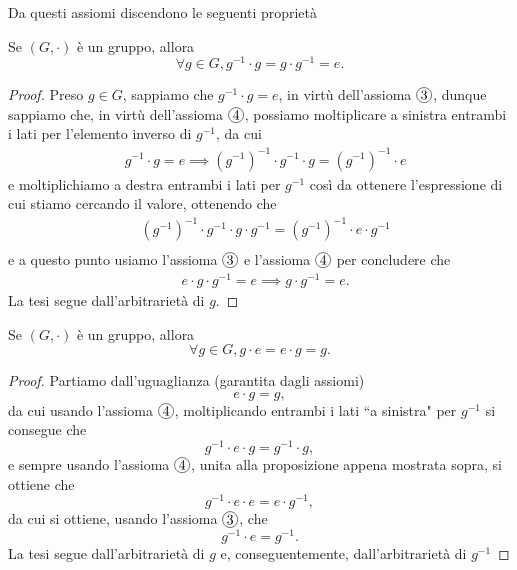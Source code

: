 Da questi assiomi discendono le seguenti proprietà
\begin{prop}
	Se $(G, \cdot)$ è un gruppo, allora
	\begin{equation}
	\forall g \in G, g^{-1} \cdot g = g \cdot g^{-1} = e. 
	\end{equation}
\end{prop}
\begin{proof}
	Preso $g \in G$, sappiamo che $g^{-1} \cdot g = e$, in virtù dell'assioma $\circled{3}$, dunque sappiamo che, in virtù dell'assioma $\circled{4}$, possiamo moltiplicare a sinistra entrambi i lati per
	l'elemento inverso di $g^{-1}$, da cui 
	\begin{align}
	&g^{-1} \cdot g = e \implies (g^{-1})^{-1} \cdot g^{-1} \cdot g = (g^{-1})^{-1} \cdot e
	\end{align}
	e moltiplichiamo a destra entrambi i lati per $g^{-1}$ così da ottenere l'espressione di cui stiamo cercando il valore, ottenendo che
	\begin{align}
	&(g^{-1})^{-1} \cdot g^{-1} \cdot g \cdot g^{-1} = (g^{-1})^{-1} \cdot e \cdot g^{-1}\\
	\end{align}
	e a questo punto usiamo l'assioma $\circled{3}$ e l'assioma $\circled{4}$ per concludere che
	\begin{align}
	&e \cdot g \cdot g^{-1} = e \implies g \cdot g^{-1} = e.
	\end{align}
	La tesi segue dall'arbitrarietà di $g$.
\end{proof}


\begin{prop}
	Se $(G, \cdot)$ è un gruppo, allora
	\begin{equation}
		\forall g \in G, g \cdot e = e \cdot g = g. 
	\end{equation}
\end{prop}
\begin{proof}
	Partiamo dall'uguaglianza (garantita dagli assiomi)
	\begin{equation}
		e \cdot g = g,
	\end{equation}
	da cui usando l'assioma $\circled{4}$, moltiplicando entrambi i lati ``a sinistra" per $g^{-1}$ si consegue che
	\begin{equation}
		g^{-1} \cdot e \cdot g = g^{-1} \cdot g,
	\end{equation}
	e sempre usando l'assioma $\circled{4}$, unita alla proposizione appena mostrata sopra, si ottiene che
	\begin{equation}
		g^{-1} \cdot e \cdot e = e \cdot g^{-1},
	\end{equation}
	da cui si ottiene, usando l'assioma $\circled{3}$, che
	\begin{equation}
		g^{-1} \cdot e = g^{-1}.
	\end{equation}
	La tesi segue dall'arbitrarietà di $g$ e, conseguentemente, dall'arbitrarietà di $g^{-1}$
\end{proof}

